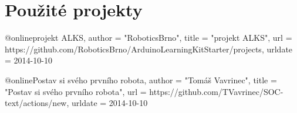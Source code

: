 \section{Použité projekty}
@online{projekt ALKS,
	author = "RoboticsBrno", %
    title = "projekt ALKS", %
    url = {https://github.com/RoboticsBrno/ArduinoLearningKitStarter/projects},
    urldate = {2014-10-10}
}

    @online{Postav si svého prvního robota,
	author = "Tomáš Vavrinec",
    title = "Postav si svého prvního robota", 
    url = {https://github.com/TVavrinec/SOC-text/actions/new},
    urldate = {2014-10-10}
}   

